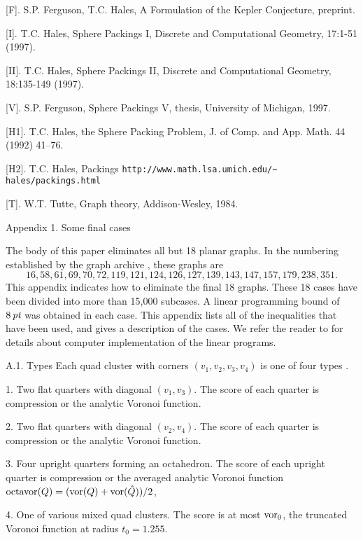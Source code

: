 \bigskip
\vfill\eject
\Refs
\bigskip

[F].  S.P. Ferguson, T.C. Hales, A Formulation of the Kepler
	Conjecture, preprint.

[I].  T.C. Hales, Sphere Packings I, Discrete and
	Computational Geometry, 17:1-51 (1997).

[II]. T.C. Hales, Sphere Packings II, Discrete and
	Computational Geometry, 18:135-149 (1997).

[V]. S.P. Ferguson, Sphere Packings V, thesis, 
	University of Michigan, 1997.

[H1]. T.C. Hales, the Sphere Packing Problem, J. of Comp. and App. Math. 44
	(1992) 41--76.

[H2]. T.C. Hales, Packings 
	{\tt http://www.math.lsa.umich.edu/\~\relax 
		hales/packings.html}

[T]. W.T. Tutte, Graph theory, Addison-Wesley, 1984.

\endRefs
\newpage



 
\head Appendix 1. Some final cases\endhead

The body of this paper eliminates all but 18 planar graphs. 
In the numbering established by the graph archive \cite{H2},
these graphs are 
$$16, 58, 61, 69, 70, 72, 119, 121, 124, 126, 127, 139, 143,
    147, 157, 179, 238, 351.$$
 This
appendix indicates how to eliminate the final 18 graphs.  These
18 cases have been divided into more than 15,000 subcases.  A linear
programming bound of $8\,\hbox{\it pt}$ was obtained in each case.  This
appendix lists all of the inequalities that have been used, and
gives a description of the cases.  We refer the reader to \cite{X} for
details about computer implementation of the linear programs. 

\subhead A.1. Types\endsubhead
Each quad cluster with corners $(v_1,v_2,v_3,v_4)$ is one of four
types \cite{F}.

	1.  Two flat quarters with diagonal $(v_1,v_3)$.  The score of
	each quarter is compression or the analytic Voronoi function.

	2.  
	  Two flat quarters with diagonal $(v_2,v_4)$.  The score of
	each quarter is compression or the analytic Voronoi function.

	3.  Four upright quarters forming an octahedron.  The score of
	each upright quarter is compression or the averaged analytic
	Voronoi function $\operatorname{octavor}(Q)=(\operatorname{vor}(Q)+\operatorname{vor}(\hat Q))/2$,

	4.  One of various mixed quad clusters.  The score is at most
	$\operatorname{vor}_0$, the truncated Voronoi function at radius $t_0=1.255$.

